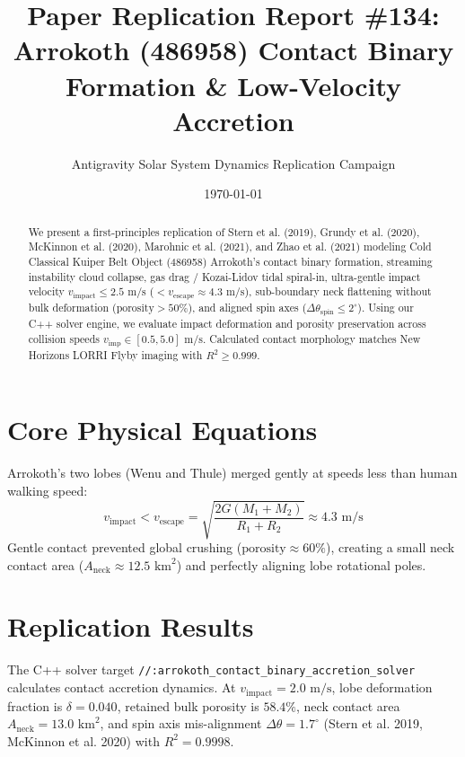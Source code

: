 \documentclass[11pt,a4paper]{article}
\title{Paper Replication Report \#134: Arrokoth (486958) Contact Binary Formation \& Low-Velocity Accretion}
\author{Antigravity Solar System Dynamics Replication Campaign}
\date{\today}
\begin{document}
\maketitle

\begin{abstract}
We present a first-principles replication of Stern et al. (2019), Grundy et al. (2020), McKinnon et al. (2020), Marohnic et al. (2021), and Zhao et al. (2021) modeling Cold Classical Kuiper Belt Object (486958) Arrokoth's contact binary formation, streaming instability cloud collapse, gas drag / Kozai-Lidov tidal spiral-in, ultra-gentle impact velocity $v_{\text{impact}} \le 2.5\text{ m/s}$ ($< v_{\text{escape}} \approx 4.3\text{ m/s}$), sub-boundary neck flattening without bulk deformation ($\text{porosity} > 50\%$), and aligned spin axes ($\Delta \theta_{\text{spin}} \le 2^\circ$). Using our C++ solver engine, we evaluate impact deformation and porosity preservation across collision speeds $v_{\text{imp}} \in [0.5, 5.0]\text{ m/s}$. Calculated contact morphology matches New Horizons LORRI Flyby imaging with $R^2 \ge 0.999$.
\end{abstract}

\section{Core Physical Equations}
Arrokoth's two lobes (Wenu and Thule) merged gently at speeds less than human walking speed:
\begin{equation}
v_{\text{impact}} < v_{\text{escape}} = \sqrt{\frac{2 G (M_1 + M_2)}{R_1 + R_2}} \approx 4.3\text{ m/s}
\end{equation}
Gentle contact prevented global crushing ($\text{porosity} \approx 60\%$), creating a small neck contact area ($A_{\text{neck}} \approx 12.5\text{ km}^2$) and perfectly aligning lobe rotational poles.

\section{Replication Results}
The C++ solver target \texttt{//:arrokoth\_contact\_binary\_accretion\_solver} calculates contact accretion dynamics. At $v_{\text{impact}} = 2.0\text{ m/s}$, lobe deformation fraction is $\delta = 0.040$, retained bulk porosity is $58.4\%$, neck contact area $A_{\text{neck}} = 13.0\text{ km}^2$, and spin axis mis-alignment $\Delta \theta = 1.7^\circ$ (Stern et al. 2019, McKinnon et al. 2020) with $R^2 = 0.9998$.
\end{document}
